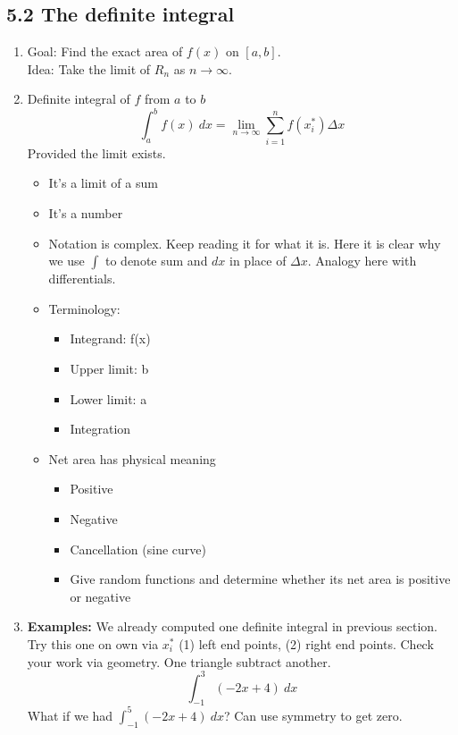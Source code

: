 \documentclass{article}
\begin{document}
\subsection{5.2 The definite integral}
\begin{enumerate}

\item Goal: Find the exact area of $f(x)$ on $[a,b]$. \\
Idea: Take the limit of $R_n$ as $n\rightarrow \infty$.

\item  Definite integral of  $f$ from $a$ to $b$
$$
\int_a^b f(x)~dx = \lim_{n\rightarrow \infty} \sum_{i=1}^n f(x_i^*)\Delta x
$$
Provided  the limit exists.
\begin{itemize}
\item It's a limit of a sum
\item It's a number
\item Notation is complex. Keep reading it for what it is. Here it is clear why we use $\int$ to denote sum and $dx$ in place of $\Delta x$. Analogy here with differentials.
\item Terminology:
\begin{itemize}
\item Integrand: f(x)
\item Upper limit: b
\item Lower limit: a
\item Integration
\end{itemize}
\item Net area has physical meaning
\begin{itemize}
\item Positive
\item Negative
\item Cancellation (sine curve)
\item Give random functions and determine whether its net area is positive or negative
\end{itemize}
\end{itemize}

\item {\bf Examples:} We already computed one definite integral in previous section. Try this one on own via $x_i^*$ (1) left end points, (2) right end points. Check your work via geometry. One triangle subtract another.
$$
\int_{-1}^3 (-2x+4)~dx
$$
What if we had $\int_{-1}^5 (-2x+4)~dx$? Can use symmetry to get zero.


\end{enumerate}
\end{document}
